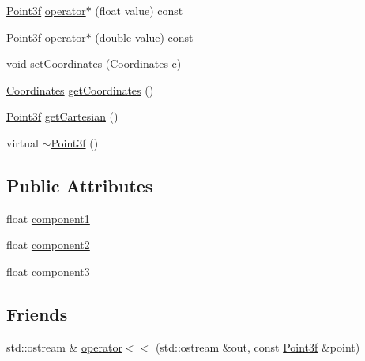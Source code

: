 \begin{DoxyCompactItemize}
\item 
\hyperlink{classccmc_1_1_point3f}{Point3f} \hyperlink{classccmc_1_1_point3f_a5e9fecd4a0dd329cdd004e9fc1413960}{operator$\ast$} (float value) const 
\item 
\hyperlink{classccmc_1_1_point3f}{Point3f} \hyperlink{classccmc_1_1_point3f_a42181791dbfa1f0993b1c3c4aa9dada1}{operator$\ast$} (double value) const 
\item 
void \hyperlink{classccmc_1_1_point3f_a5f3b223b9cd01019fb2c63c9dbbdb0a7}{set\-Coordinates} (\hyperlink{classccmc_1_1_point3f_a41ca3743444f541586ededdd77c9762b}{Coordinates} c)
\item 
\hyperlink{classccmc_1_1_point3f_a41ca3743444f541586ededdd77c9762b}{Coordinates} \hyperlink{classccmc_1_1_point3f_a3a892d6a54d00f5ff614dc9ac26a7b37}{get\-Coordinates} ()
\item 
\hyperlink{classccmc_1_1_point3f}{Point3f} \hyperlink{classccmc_1_1_point3f_acea5d97d71a3bac917579dd097ab95aa}{get\-Cartesian} ()
\item 
virtual \hyperlink{classccmc_1_1_point3f_a9d965ee98abb1628bd55f6400e0311f6}{$\sim$\-Point3f} ()
\end{DoxyCompactItemize}
\subsection*{Public Attributes}
\begin{DoxyCompactItemize}
\item 
float \hyperlink{classccmc_1_1_point3f_a3e9b0696019ec1577083dc8d2918ea46}{component1}
\item 
float \hyperlink{classccmc_1_1_point3f_adc52014c3135cbf699d7785e901e18a3}{component2}
\item 
float \hyperlink{classccmc_1_1_point3f_a9f6adb1d63a8d54913c30e1b62b118fd}{component3}
\end{DoxyCompactItemize}
\subsection*{Friends}
\begin{DoxyCompactItemize}
\item 
std\-::ostream \& \hyperlink{classccmc_1_1_point3f_a8b95f610a04fd4cbe272dab85e565dd3}{operator$<$$<$} (std\-::ostream \&out, const \hyperlink{classccmc_1_1_point3f}{Point3f} \&point)
\end{DoxyCompactItemize}


